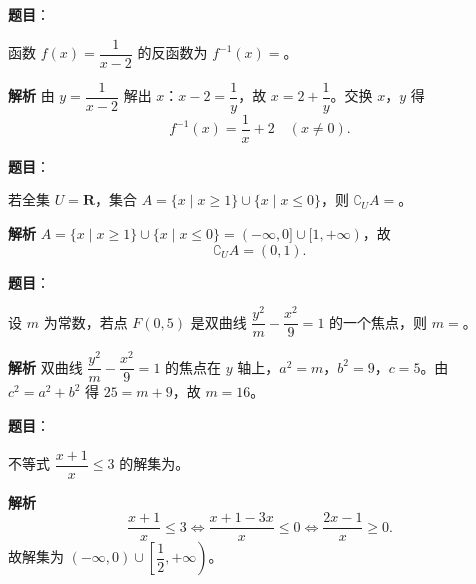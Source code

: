 
\begin{answer}

\textbf{题目}：

函数 $f(x)=\dfrac1{x-2}$ 的反函数为 $f^{-1}(x)=$\gkblank{}。

\textbf{解析}
由 $y=\dfrac1{x-2}$ 解出 $x$：$x-2=\dfrac1y$，故 $x=2+\dfrac1y$。交换 $x$，$y$ 得
\nopagebreak[4]
\[f^{-1}(x)=\frac1x+2\quad(x\neq0).\]


\end{answer}
\begin{answer}

\textbf{题目}：

若全集 $U=\mathbf R$，集合 $A=\{x\mid x\geqslant1\}\cup\{x\mid x\leqslant0\}$，则 $\complement_U A=$\gkblank{}。

\textbf{解析}
$A=\{x\mid x\geqslant1\}\cup\{x\mid x\leqslant0\}=(-\infty,0]\cup[1,+\infty)$，故
\nopagebreak[4]
\[\complement_U A=(0,1).\]


\end{answer}
\begin{answer}

\textbf{题目}：

设 $m$ 为常数，若点 $F(0,5)$ 是双曲线 $\dfrac{y^2}{m}-\dfrac{x^2}{9}=1$ 的一个焦点，则 $m=$\gkblank{}。

\textbf{解析}
双曲线 $\dfrac{y^2}{m}-\dfrac{x^2}{9}=1$ 的焦点在 $y$ 轴上，$a^2=m$，$b^2=9$，$c=5$。由 $c^2=a^2+b^2$ 得 $25=m+9$，故 $m=16$。


\end{answer}
\begin{answer}

\textbf{题目}：

不等式 $\dfrac{x+1}{x}\leqslant3$ 的解集为\gkblank{}。

\textbf{解析}
\nopagebreak[4]
\[\frac{x+1}{x}\leqslant3\iff\frac{x+1-3x}{x}\leqslant0\iff\frac{2x-1}{x}\geqslant0.\]
故解集为 $(-\infty,0)\cup\left[\dfrac12,+\infty\right)$。

\gkanswer{答案：$(-\infty,0)\cup\left[\dfrac12,+\infty\right)$。}

\end{answer}
